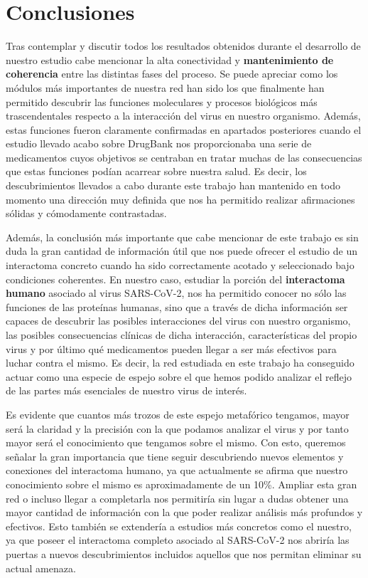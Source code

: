 \section{Conclusiones}

Tras contemplar y discutir todos los resultados obtenidos durante el desarrollo de nuestro estudio cabe mencionar la alta conectividad y \textbf{mantenimiento de coherencia} entre las distintas fases del proceso. Se puede apreciar como los módulos más importantes de nuestra red han sido los que finalmente han permitido descubrir las funciones moleculares y procesos biológicos más trascendentales respecto a la interacción del virus en nuestro organismo. Además, estas funciones fueron claramente confirmadas en apartados posteriores cuando el estudio llevado acabo sobre DrugBank nos proporcionaba una serie de medicamentos cuyos objetivos se centraban en tratar muchas de las consecuencias que estas funciones podían acarrear sobre nuestra salud. Es decir, los descubrimientos llevados a cabo durante este trabajo han mantenido en todo momento una dirección muy definida que nos ha permitido realizar afirmaciones sólidas y cómodamente contrastadas.

Además, la conclusión más importante que cabe mencionar de este trabajo es sin duda la gran cantidad de información útil que nos puede ofrecer el estudio de un interactoma concreto cuando ha sido correctamente acotado y seleccionado bajo condiciones coherentes. En nuestro caso, estudiar la porción del \textbf{interactoma humano} asociado al virus SARS-CoV-2, nos ha permitido conocer no sólo las funciones de las proteínas humanas, sino que a través de dicha información ser capaces de descubrir las posibles interacciones del virus con nuestro organismo, las posibles consecuencias clínicas de dicha interacción, características del propio virus y por último qué medicamentos pueden llegar a ser más efectivos para luchar contra el mismo. Es decir, la red estudiada en este trabajo ha conseguido actuar como una especie de espejo sobre el que hemos podido analizar el reflejo de las partes más esenciales de nuestro virus de interés.

Es evidente que cuantos más trozos de este espejo metafórico tengamos, mayor será la claridad y la precisión con la que podamos analizar el virus y por tanto mayor será el conocimiento que tengamos sobre el mismo. Con esto, queremos señalar la gran importancia que tiene seguir descubriendo nuevos elementos y conexiones del interactoma humano, ya que actualmente se afirma que nuestro conocimiento sobre el mismo es aproximadamente de un 10\%. Ampliar esta gran red o incluso llegar a completarla nos permitiría sin lugar a dudas obtener una mayor cantidad de información con la que poder realizar análisis más profundos y efectivos. Esto también se extendería a estudios más concretos como el nuestro, ya que poseer el interactoma completo asociado al SARS-CoV-2 nos abriría las puertas a nuevos descubrimientos incluidos aquellos que nos permitan eliminar su actual amenaza.

